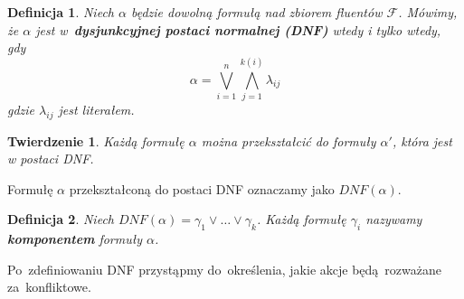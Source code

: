 \documentclass[11pt,a4paper]{article}
\newtheorem{defn}{Definicja}
\newtheorem{theorem}{Twierdzenie}
\begin{document}
\begin{defn}
    Niech $\alpha$ będzie dowolną formułą nad zbiorem fluentów $\mathcal{F}$.
    Mówimy, że $\alpha$ jest w~\textbf{dysjunkcyjnej postaci normalnej (DNF)} wtedy i tylko wtedy, gdy 
    $$\alpha = \bigvee_{i=1}^{n} \bigwedge_{j=1}^{k(i)} \lambda_{ij}$$
    gdzie $\lambda_{ij}$ jest literałem.
\end{defn}
    
\begin{theorem}
    Każdą formułę $\alpha$ można przekształcić do formuły $\alpha'$, która jest w postaci DNF.
\end{theorem}

Formułę $\alpha$ przekształconą do postaci DNF oznaczamy jako $DNF(\alpha)$.

\begin{defn}
    Niech $DNF(\alpha) = \gamma_1 \vee \dots \vee \gamma_k$.
    Każdą formułę $\gamma_i$ nazywamy \textbf{komponentem} formuły $\alpha$.
\end{defn}

Po~zdefiniowaniu DNF przystąpmy do~określenia, jakie akcje będą~rozważane za~konfliktowe.
\end{document}
